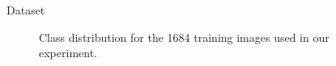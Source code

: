 \begin{section}{Dataset}
\begin{figure}[h]
	  \caption{Class distribution for the 1684 training images used in our experiment.}
	  \label{fig:classdistribution}
	\end{figure}
%
%
%

\end{section}
